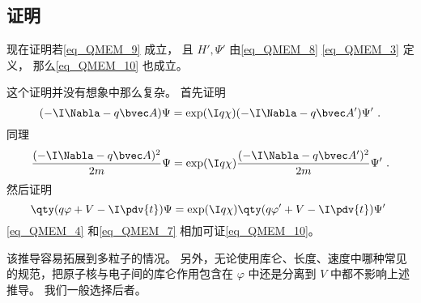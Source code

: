 \subsection{证明}\label{sub_QMEM_1}
现在证明若\autoref{eq_QMEM_9} 成立， 且 $H', \Psi'$ 由\autoref{eq_QMEM_8} \autoref{eq_QMEM_3} 定义， 那么\autoref{eq_QMEM_10} 也成立。

这个证明并没有想象中那么复杂。 首先证明
\begin{equation}
(-\I\Nabla - q\bvec A)\Psi = \exp(\I q\chi)(-\I\Nabla - q\bvec A')\Psi'~.
\end{equation}
同理
\begin{equation}\label{eq_QMEM_4}
\frac{(-\I\Nabla - q\bvec A)^2}{2m}\Psi = \exp(\I q\chi)\frac{(-\I\Nabla - q\bvec A')^2}{2m}\Psi'~.
\end{equation}
然后证明
\begin{equation}\label{eq_QMEM_7}
\qty(q\varphi + V - \I \pdv{t})\Psi= \exp(\I q\chi)\qty(q\varphi' + V - \I \pdv{t})\Psi'~
\end{equation}
\autoref{eq_QMEM_4} 和\autoref{eq_QMEM_7} 相加可证\autoref{eq_QMEM_10}。

该推导容易拓展到多粒子的情况。 另外，无论使用库仑、长度、速度中哪种常见的规范，把原子核与电子间的库仑作用包含在 $\varphi$ 中还是分离到 $V$ 中都不影响上述推导。 我们一般选择后者。
